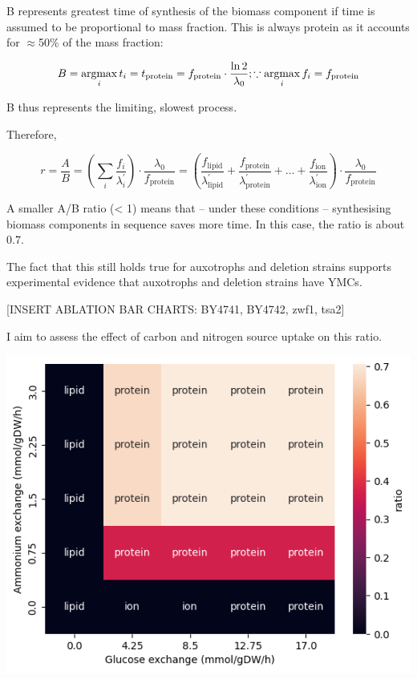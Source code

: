 B represents greatest time of synthesis of the biomass component if time is assumed to be proportional to mass fraction.
This is always protein as it accounts for $\approx$50\% of the mass fraction:

\begin{equation}
  B = \operatorname*{argmax}_{i} t_{i} = t_{\mathrm{protein}} = f_{\mathrm{protein}} \cdot \frac{\ln 2}{\lambda_{0}}; \because \operatorname*{argmax}_{i} f_{i} = f_{\mathrm{protein}}
  \label{eq:model-b}
\end{equation}

B thus represents the limiting, slowest process.

Therefore,

\begin{equation}
  r = \frac{A}{B} = (\sum_i \frac{f_i}{\lambda_i^\prime}) \cdot \frac{\lambda_0}{f_{\mathrm{protein}}} = (\frac{f_{\mathrm{lipid}}}{\lambda_{\mathrm{lipid}}^\prime} + \frac{f_{\mathrm{protein}}}{\lambda_{\mathrm{protein}}^\prime} + \ldots + \frac{f_{\mathrm{ion}}}{\lambda_{\mathrm{ion}}^\prime}) \cdot \frac{\lambda_0}{f_{\mathrm{protein}}}
  \label{eq:model-ratio}
\end{equation}


A smaller A/B ratio (< 1) means that -- under these conditions -- synthesising biomass components in sequence saves more time.
In this case, the ratio is about 0.7.

The fact that this still holds true for auxotrophs and deletion strains supports experimental evidence that auxotrophs and deletion strains have YMCs.

[INSERT ABLATION BAR CHARTS: BY4741, BY4742, zwf1, tsa2]


I aim to assess the effect of carbon and nitrogen source uptake on this ratio.

\begin{center}
\includegraphics[width=.9\linewidth]{ecYeast8-ablation-heatmap.png}
\end{center}

